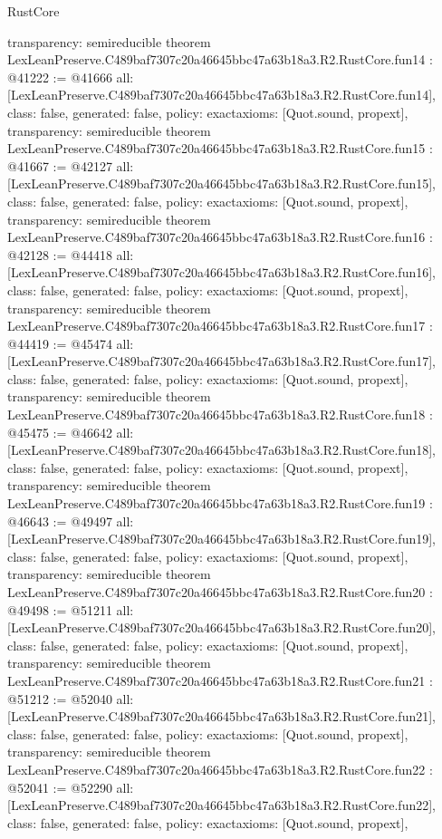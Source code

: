 \begin{lexlean}{RustCore}
\begin{coremodule}
{  transparency: semireducible
}
theorem LexLeanPreserve.C489baf7307c20a46645bbc47a63b18a3.R2.RustCore.fun14 : @41222 := @41666 {
  all: [LexLeanPreserve.C489baf7307c20a46645bbc47a63b18a3.R2.RustCore.fun14],
  class: false,
  generated: false,
  policy: exact{axioms: [Quot.sound, propext]},
  transparency: semireducible
}
theorem LexLeanPreserve.C489baf7307c20a46645bbc47a63b18a3.R2.RustCore.fun15 : @41667 := @42127 {
  all: [LexLeanPreserve.C489baf7307c20a46645bbc47a63b18a3.R2.RustCore.fun15],
  class: false,
  generated: false,
  policy: exact{axioms: [Quot.sound, propext]},
  transparency: semireducible
}
theorem LexLeanPreserve.C489baf7307c20a46645bbc47a63b18a3.R2.RustCore.fun16 : @42128 := @44418 {
  all: [LexLeanPreserve.C489baf7307c20a46645bbc47a63b18a3.R2.RustCore.fun16],
  class: false,
  generated: false,
  policy: exact{axioms: [Quot.sound, propext]},
  transparency: semireducible
}
theorem LexLeanPreserve.C489baf7307c20a46645bbc47a63b18a3.R2.RustCore.fun17 : @44419 := @45474 {
  all: [LexLeanPreserve.C489baf7307c20a46645bbc47a63b18a3.R2.RustCore.fun17],
  class: false,
  generated: false,
  policy: exact{axioms: [Quot.sound, propext]},
  transparency: semireducible
}
theorem LexLeanPreserve.C489baf7307c20a46645bbc47a63b18a3.R2.RustCore.fun18 : @45475 := @46642 {
  all: [LexLeanPreserve.C489baf7307c20a46645bbc47a63b18a3.R2.RustCore.fun18],
  class: false,
  generated: false,
  policy: exact{axioms: [Quot.sound, propext]},
  transparency: semireducible
}
theorem LexLeanPreserve.C489baf7307c20a46645bbc47a63b18a3.R2.RustCore.fun19 : @46643 := @49497 {
  all: [LexLeanPreserve.C489baf7307c20a46645bbc47a63b18a3.R2.RustCore.fun19],
  class: false,
  generated: false,
  policy: exact{axioms: [Quot.sound, propext]},
  transparency: semireducible
}
theorem LexLeanPreserve.C489baf7307c20a46645bbc47a63b18a3.R2.RustCore.fun20 : @49498 := @51211 {
  all: [LexLeanPreserve.C489baf7307c20a46645bbc47a63b18a3.R2.RustCore.fun20],
  class: false,
  generated: false,
  policy: exact{axioms: [Quot.sound, propext]},
  transparency: semireducible
}
theorem LexLeanPreserve.C489baf7307c20a46645bbc47a63b18a3.R2.RustCore.fun21 : @51212 := @52040 {
  all: [LexLeanPreserve.C489baf7307c20a46645bbc47a63b18a3.R2.RustCore.fun21],
  class: false,
  generated: false,
  policy: exact{axioms: [Quot.sound, propext]},
  transparency: semireducible
}
theorem LexLeanPreserve.C489baf7307c20a46645bbc47a63b18a3.R2.RustCore.fun22 : @52041 := @52290 {
  all: [LexLeanPreserve.C489baf7307c20a46645bbc47a63b18a3.R2.RustCore.fun22],
  class: false,
  generated: false,
  policy: exact{axioms: [Quot.sound, propext]},
}
\end{coremodule}
\end{lexlean}
